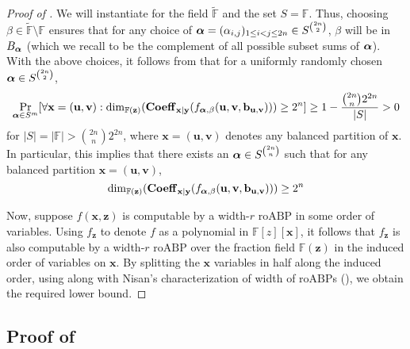 \documentclass[11pt]{article}
\newcommand{\F}{\mathbb{F}}
\newcommand{\roABP}{\mathrm{roABP}}
\begin{document}
\roabplbdanyorder
\begin{proof}[Proof of ]\label{proof:thm:roabp-lbd-any-order-positive-char}
    We will instantiate  for the field $\tilde{\F}$ and the set $S = \F$. Thus, choosing $\beta \in \tilde{\F}\setminus\F$ ensures that for any choice of $\boldsymbol{\alpha} = (\alpha_{i,j})_{1\leq i <j\leq 2n} \in S^{\binom{2n}{2}}$, $\beta$ will be in $B_{\boldsymbol{\alpha}}$ (which we recall to be the complement of all possible subset sums of $\boldsymbol{\alpha}$).
    With the above choices, it follows from  that for a uniformly randomly chosen $\boldsymbol{\alpha} \in S^{\binom{2n}{2}}$, 
    $$ \Pr_{\bfalpha \in S^{m}}[\forall \mathbf{x} = (\mathbf{u},\mathbf{v}): \dim_{\F(\mathbf{z})}(\bfCoeff_{\mathbf{x}|\mathbf{y}}(f_{\bfalpha,\beta}(\mathbf{u},\mathbf{v},\mathbf{b}_{\mathbf{u},\mathbf{v}}))) \geq 2^n] \geq 1-\frac{\binom{2n}{n}2^{2n}}{|S|} > 0$$
    for $|S| = |\F|> \binom{2n}{n}2^{2n}$, where $\mathbf{x}=(\mathbf{u},\mathbf{v})$ denotes any balanced partition of $\mathbf{x}$. In particular, this implies that there exists an $\boldsymbol{\alpha} \in S^{\binom{2n}{n}}$ such that for any balanced partition $\mathbf{x} = (\mathbf{u},\mathbf{v})$,
    \begin{equation}\label{eqn: coeff dim lbd all partitions}
    \dim_{\F(\mathbf{z})}(\bfCoeff_{\mathbf{x}|\mathbf{y}}(f_{\bfalpha,\beta}(\mathbf{u},\mathbf{v},\mathbf{b}_{\mathbf{u},\mathbf{v}}))) \geq 2^n
    \end{equation}

    Now, suppose $f(\mathbf{x},\mathbf{z})$ is computable by a width-$r$ $\roABP$ in some order of variables. Using $f_\mathbf{z}$ to denote $f$ as a polynomial in $\F[z][\mathbf{x}]$, it follows that $f_\mathbf{z}$ is also computable by a width-$r$ $\roABP$ over the fraction field $\F(\mathbf{z})$ in the induced order of variables on $\mathbf{x}$. By splitting the $\mathbf{x}$ variables in half along the induced order, using  along with Nisan's characterization of width of $\roABP$s (), we obtain the required lower bound.
\end{proof}











\subsection{Proof of }\label{app:proof-monomial-axioms}
\end{document}
